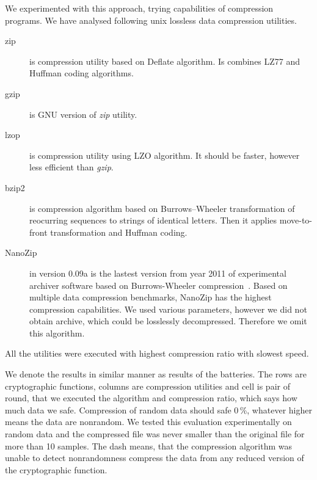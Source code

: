 \documentclass[
  print, %
  Table,   %
  nolof,     %
  nolot,     %
  11pt, %
  oneside  %
]{fithesis3}
\begin{document}
We experimented with this approach, trying capabilities of compression programs. We have analysed following unix lossless data compression utilities.

\begin{description}
    \item[zip] is compression utility based on Deflate algorithm. Is combines LZ77 and Huffman coding algorithms.
    \item[gzip] is GNU version of \textit{zip} utility.
    \item[lzop] is compression utility using LZO algorithm. It should be faster, however less efficient than \textit{gzip}.
    \item[bzip2] is compression algorithm based on Burrows–Wheeler transformation of reocurring sequences to strings of identical letters. Then it applies move-to-front transformation and Huffman coding. 
    \item[NanoZip] in version 0.09a is the lastest version from year 2011 of experimental archiver software based on Burrows-Wheeler compression~\cite{nanozip}. Based on multiple data compression benchmarks, NanoZip has the highest compression capabilities. We used various parameters, however we did not obtain archive, which could be losslessly decompressed. Therefore we omit this algorithm.
\end{description}

All the utilities were executed with highest compression ratio with slowest speed.

We denote the results in similar manner as results of the batteries. The rows are cryptographic functions, columns are compression utilities and cell is pair of round, that we executed the algorithm and compression ratio, which says how much data we safe. Compression of random data should safe 0\,\%, whatever higher means the data are nonrandom. We tested this evaluation experimentally on random data and the compressed file was never smaller than the original file for more than 10 samples. The dash means, that the compression algorithm was unable to detect nonrandomness compress the data from any reduced version of the cryptographic function.
\end{document}
